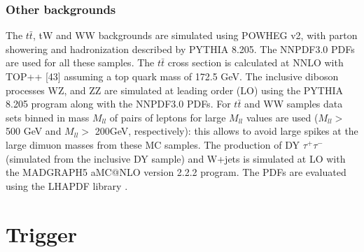\subsubsection{Other backgrounds}
The $t\bar{t}$, tW and WW backgrounds are simulated using POWHEG v2, with parton showering and hadronization described by PYTHIA 8.205. The NNPDF3.0 PDFs are used for all these samples. The $t\bar{t}$ cross section is calculated at NNLO with TOP++ [43] assuming a top quark mass of 172.5 GeV. The inclusive diboson processes WZ, and ZZ are simulated at leading order (LO) using the PYTHIA 8.205 program along with the NNPDF3.0 PDFs. For $t\bar{t}$ and WW samples data sets binned in mass $M_{ll}$ of pairs of leptons for large $M_{ll}$ values are used ($M_{ll} >$ 500 GeV and $M_{ll} >$ 200GeV, respectively): this allows to avoid large spikes at the large dimuon masses from these MC samples.
The production of DY $\tau^+\tau^-$ (simulated from the inclusive DY sample) and W+jets is simulated at LO with the MADGRAPH5 aMC@NLO version 2.2.2 \cite{MADGRAPH} program. The PDFs are evaluated using the LHAPDF library \cite{PDFS_1,  PDFS_2, PDFS_3}.

\section{Trigger}
